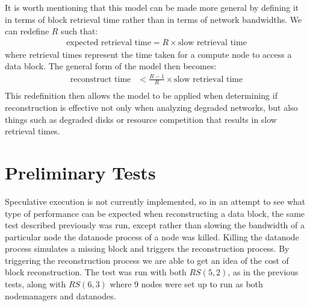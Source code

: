 \documentclass{ucetd}
\newcommand{\eqbegin}{\begin{equation*} \begin{aligned}}
\newcommand{\eqend}{\end{aligned} \end{equation*}}
\begin{document}
It is worth mentioning that this model can be made more general by defining it
in terms of block retrieval time rather than in terms of network bandwidths. We
can redefine $R$ such that:
\eqbegin
    \text{expected retrieval time} = R \times \text{slow retrieval time}
\eqend
where retrieval times represent the time taken for a compute node to access a
data block. The general form of the model then becomes:
\eqbegin
    \text{reconstruct time}
    &< \frac{R - 1}{R} \times \text{slow retrieval time} \\
\eqend
This redefinition then allows the model to be applied when determining if
reconstruction is effective not only when analyzing degraded networks, but also
things such as degraded disks or resource competition that results in slow
retrieval times.

\section{Preliminary Tests}

Speculative execution is not currently implemented, so in an attempt to see what
type of performance can be expected when reconstructing a data block, the same
test described previously was run, except rather than slowing the bandwidth of a
particular node the datanode process of a node was killed. Killing the datanode
process simulates a missing block and triggers the reconstruction process. By
triggering the reconstruction process we are able to get an idea of the cost of
block reconstruction. The test was run with both $RS(5,2)$, as in the previous
tests, along with $RS(6,3)$ where 9 nodes were set up to run as both
nodemanagers and datanodes.
\end{document}
